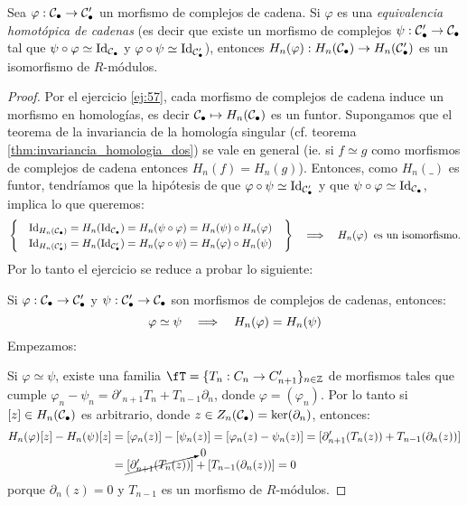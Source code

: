 \begin{ejercicio}\label{ej:71}
  Sea $\varphi:\mathcal{C}_{\bullet}\rightarrow\mathcal{C}'_{\bullet}$ un morfismo de complejos de cadena.
  Si $\varphi$ es una \emph{equivalencia homot\'opica de cadenas} (es decir que
  existe un morfismo de complejos $\psi:\mathcal{C}'_{\bullet}\rightarrow\mathcal{C}_{\bullet}$ tal que
  $\psi\circ\varphi\simeq\text{Id}_{\mathcal{C}_{\bullet}}$ y $\varphi\circ\psi\simeq\text{Id}_{\mathcal{C}'_{\bullet}}$),
  entonces $H_{n}(\varphi):H_n(\mathcal{C}_{\bullet})\rightarrow H_n(\mathcal{C}'_{\bullet})$ es un isomorfismo
  de $R$-m\'odulos.
\end{ejercicio}
\begin{proof}%
  Por el ejercicio \ref{ej:57}, cada morfismo de complejos de cadena induce un morfismo
  en homolog\'ias, es decir $\mathcal{C}_{\bullet}\mapsto H_n(\mathcal{C}_{\bullet})$ es un funtor.
  Supongamos que el teorema de la invariancia de la homolog\'ia singular (cf. teorema
  \ref{thm:invariancia_homologia_dos}) se vale en general (ie. si $f \simeq g$ como
  morfismos de complejos de cadena entonces $H_n(f)=H_n(g)$). Entonces, como
  $H_n(\_)$ es funtor, tendr\'iamos que  la hip\'otesis de que
  $\varphi\circ\psi\simeq\text{Id}_{\mathcal{C}'_{\bullet}}$ y que $\psi\circ\varphi\simeq\text{Id}_{\mathcal{C}_{\bullet}}$,
  implica lo que queremos:
  \[
    \left.
    \begin{cases}
      \quad\text{Id}_{H_n(\mathcal{C}_{\bullet})} =H_n(\text{Id}_{\mathcal{C}_{\bullet}})=
      H_n(\psi\circ\varphi)=H_n(\psi)\circ H_n(\varphi)\\
      \quad\text{Id}_{H_n(\mathcal{C}'_{\bullet})}=H_n(\text{Id}_{\mathcal{C}'_{\bullet}})=
      H_n(\varphi\circ\psi)=H_n(\varphi)\circ H_n(\psi)
    \end{cases}\right\}
    \quad\Longrightarrow\quad H_n(\varphi)\;\;\text{es un isomorfismo}.
  \]
  Por lo tanto el ejercicio se reduce a probar lo siguiente:
  
  Si $\varphi:\mathcal{C}_{\bullet}\rightarrow\mathcal{C}'_{\bullet}$ y $\psi:\mathcal{C}'_{\bullet}\rightarrow\mathcal{C}_{\bullet}$ son morfismos
  de complejos de cadenas, entonces:
  \begin{equation}
    \label{eq:ej_71}
    \varphi\simeq\psi \quad\Longrightarrow\quad H_n(\varphi)=H_n(\psi)
  \end{equation}
  Empezamos:

  Si $\varphi\simeq\psi$, existe una familia $\fT=\{T_n:C_n\ra C_{n+1}'\}_{n\in\ZZ}$
  de morfismos tales que cumple $\varphi_n-\psi_n=\partial'_{n+1}T_n+T_{n-1}\partial_n$,
  donde $\varphi=(\varphi_n)$. Por lo tanto si $[z]\in H_n(\mathcal{C}_{\bullet})$ es arbitrario,
  donde $z\in Z_n(\mathcal{C}_{\bullet})=\ker(\partial_n)$, entonces:
  \begin{align*}
    H_n(\varphi)[z]-H_n(\psi)[z]&=[\varphi_n(z)]-[\psi_n(z)]=[\varphi_n(z)-\psi_n(z)]=
    [\partial'_{n+1}(T_n(z))+T_{n-1}(\partial_n(z))]\\ & =
    \cancelto{0}{[\partial'_{n+1}(T_n(z))]}+[T_{n-1}(\partial_n(z))]=0
  \end{align*}
  porque $\partial_n(z)=0$ y $T_{n-1}$ es un morfismo de $R$-m\'odulos.
\end{proof}%